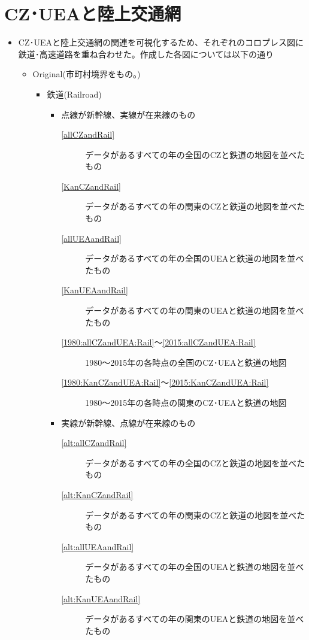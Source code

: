 \documentclass{ltjsarticle}
\begin{document}
  
\clearpage

\section{CZ･UEAと陸上交通網}
\begin{itemize}
  \item CZ･UEAと陸上交通網の関連を可視化するため、それぞれのコロプレス図に鉄道･高速道路を重ね合わせた。作成した各図については以下の通り
  \begin{itemize}
    \item Original(市町村境界をもの。)
    \begin{itemize}
      \item 鉄道(Railroad)
      \begin{itemize}
        \item 点線が新幹線、実線が在来線のもの
        \begin{description}
          \item[\ref{allCZandRail}] データがあるすべての年の全国のCZと鉄道の地図を並べたもの
          \item[\ref{KanCZandRail}] データがあるすべての年の関東のCZと鉄道の地図を並べたもの
          \item[\ref{allUEAandRail}] データがあるすべての年の全国のUEAと鉄道の地図を並べたもの
          \item[\ref{KanUEAandRail}] データがあるすべての年の関東のUEAと鉄道の地図を並べたもの
          \item[\ref{1980:allCZandUEA:Rail}～\ref{2015:allCZandUEA:Rail}] 1980～2015年の各時点の全国のCZ･UEAと鉄道の地図
          \item[\ref{1980:KanCZandUEA:Rail}～\ref{2015:KanCZandUEA:Rail}] 1980～2015年の各時点の関東のCZ･UEAと鉄道の地図
        \end{description}
        \item 実線が新幹線、点線が在来線のもの
        \begin{description}
          \item[\ref{alt:allCZandRail}] データがあるすべての年の全国のCZと鉄道の地図を並べたもの
          \item[\ref{alt:KanCZandRail}] データがあるすべての年の関東のCZと鉄道の地図を並べたもの
          \item[\ref{alt:allUEAandRail}] データがあるすべての年の全国のUEAと鉄道の地図を並べたもの
          \item[\ref{alt:KanUEAandRail}] データがあるすべての年の関東のUEAと鉄道の地図を並べたもの

\end{description}
\end{itemize}
\end{itemize}
\end{itemize}
\end{itemize}
\end{document}
